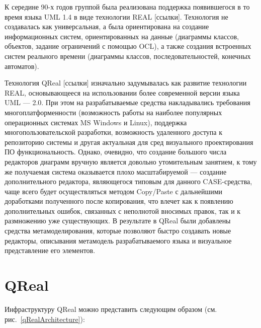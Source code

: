 \documentclass[a4paper]{article}
\begin{document}
К середине 90-х годов группой была реализована поддержка появившегося в то время языка UML 1.4 в виде технологии REAL [ссылки]. Технология не создавалась как универсальная, а была ориентирована на создание информационных систем, ориентированных на данные (диаграммы классов, объектов, задание ограничений с помощью OCL), а также создания встроенных систем реального времени (диаграммы классов, последовательностей, конечных автоматов). 

Технология QReal [ссылки] изначально задумывалась как развитие технологии REAL, основывающееся на использовании более современной версии языка UML --- 2.0. При этом на разрабатываемые средства накладывались требования многоплатформенности (возможность работы на наиболее популярных операционных системах MS Windows и Linux), поддержка многопользовательской разработки, возможность удаленного доступа к репозиторию системы и другая актуальная для сред визуального проектирования ПО функциональность. Однако, очевидно, что создание большого числа редакторов диаграмм вручную является довольно утомительным занятием, к тому же получаемая система оказывается плохо масштабируемой --- создание дополнительного редактора, являющегося типовым для данного CASE-средства, чаще всего будет осуществляться методом Copy/Paste с дальнейшими доработками полученного после копирования, что влечет как к появлению дополнительных ошибок, связанных с неполнотой вносимых правок, так и к размножению уже существующих. В результате в QReal были добавлены средства метамоделирования, которые позволяют быстро создавать новые редакторы, описывания метамодель разрабатываемого языка и визуальное представление его элементов.

\section{QReal}

Инфраструктуру QReal можно представить следующим образом (см. рис.~\ref{qRealArchitecture}):
\end{document}
